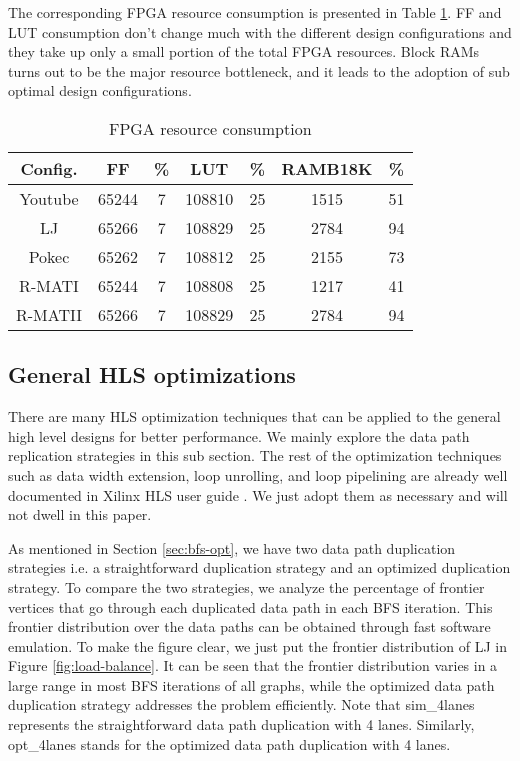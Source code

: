 The corresponding FPGA resource consumption is presented in Table \ref{tab:mem-resource}. 
FF and LUT consumption don't change much with the different 
design configurations and they take up only a small portion 
of the total FPGA resources. Block RAMs turns out to be the major 
resource bottleneck, and it leads to the adoption of sub optimal 
design configurations.

\begin{table}
  \caption{FPGA resource consumption}
  \label{tab:mem-resource}
    \centering
  \begin{tabular}{ccccccc}
    \toprule
      Config. & FF & \% & LUT & \% & RAMB18K & \% \\
    \midrule
      Youtube  & 65244 & 7 & 108810 & 25 & 1515  & 51 \\
      LJ       & 65266 & 7 & 108829 & 25 & 2784  & 94 \\
      Pokec    & 65262 & 7 & 108812 & 25 & 2155 & 73 \\
      R-MATI   & 65244 & 7 & 108808 & 25 & 1217 & 41 \\
      R-MATII  & 65266 & 7 & 108829 & 25 & 2784 & 94 \\
  \bottomrule
\end{tabular}
\end{table}

\subsection{General HLS optimizations}
There are many HLS optimization techniques that can be applied to the 
general high level designs for better performance. We mainly explore the 
data path replication strategies in this sub section. The rest of the 
optimization techniques such as data width extension, loop unrolling, 
and loop pipelining are already well documented in Xilinx HLS user guide \cite{ug902}. 
We just adopt them as necessary and will not dwell in this paper. 

As mentioned in Section \ref{sec:bfs-opt}, we have two data path 
duplication strategies i.e. a straightforward duplication strategy and 
an optimized duplication strategy. To compare the two strategies, we analyze the percentage 
of frontier vertices that go through each duplicated data path in each BFS iteration. 
This frontier distribution over the data paths can be obtained through fast software emulation.
To make the figure clear, we just put the frontier distribution of LJ in Figure \ref{fig:load-balance}. 
It can be seen that the frontier distribution varies in a large 
range in most BFS iterations of all graphs, while the optimized data path duplication strategy 
addresses the problem efficiently. Note that sim\_4lanes represents the straightforward 
data path duplication with 4 lanes. Similarly, opt\_4lanes stands for 
the optimized data path duplication with 4 lanes.

